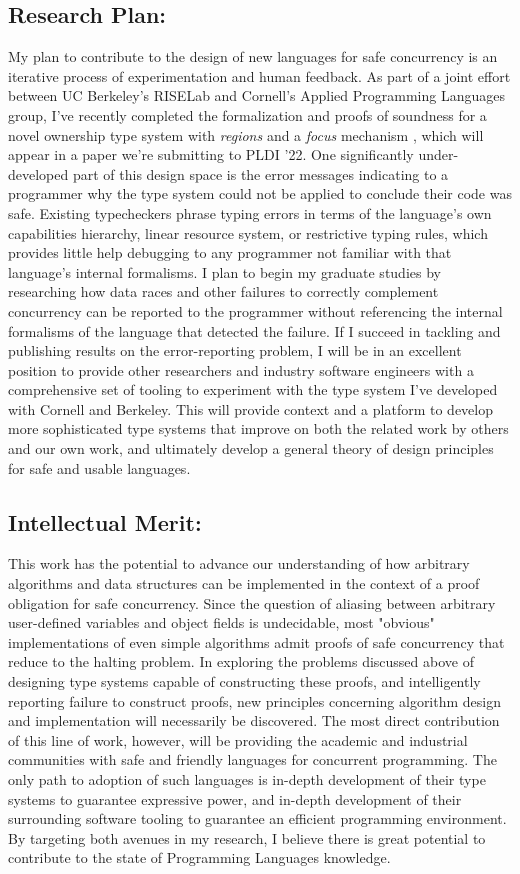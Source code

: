 \documentclass{nsf-grfp}
\begin{document}
\subsection*{Research Plan:} My plan to contribute to the design of new languages for safe concurrency is an iterative process of experimentation and human feedback. As part of a joint effort between UC Berkeley's RISELab and Cornell's Applied Programming Languages group, I've recently completed the formalization and proofs of soundness for a novel ownership type system with \textit{regions} \cite{regions} and a \textit{focus} mechanism \cite{vault}, which will appear in a paper we're submitting to PLDI '22. One significantly under-developed part of this design space is the error messages indicating to a programmer why the type system could not be applied to conclude their code was safe. Existing typecheckers phrase typing errors in terms of the language's own capabilities hierarchy, linear resource system, or restrictive typing rules, which provides little help debugging to any programmer not familiar with that language's internal formalisms. I plan to begin my graduate studies by researching how data races and other failures to correctly complement concurrency can be reported to the programmer without referencing the internal formalisms of the language that detected the failure. If I succeed in tackling and publishing results on the error-reporting problem, I will be in an excellent position to provide other researchers and industry software engineers with a comprehensive set of tooling to experiment with the type system I've developed with Cornell and Berkeley. This will provide context and a platform to develop more sophisticated type systems that improve on both the related work by others and our own work, and ultimately develop a general theory of design principles for safe and usable languages. 

\subsection*{Intellectual Merit:} This work has the potential to advance our understanding of how arbitrary algorithms and data structures can be implemented in the context of a proof obligation for safe concurrency. Since the question of aliasing between arbitrary user-defined variables and object fields is undecidable, most "obvious" implementations of even simple algorithms admit proofs of safe concurrency that reduce to the halting problem. In exploring the problems discussed above of designing type systems capable of constructing these proofs, and intelligently reporting failure to construct proofs, new principles concerning algorithm design and implementation will necessarily be discovered. The most direct contribution of this line of work, however, will be providing the academic and industrial communities with safe and friendly languages for concurrent programming. The only path to adoption of such languages is in-depth development of their type systems to guarantee expressive power, and in-depth development of their surrounding software tooling to guarantee an efficient programming environment. By targeting both avenues in my research, I believe there is great potential to contribute to the state of Programming Languages knowledge.
\end{document}
